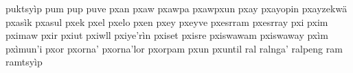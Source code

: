 puktsyìp\hspace{2mm}
pum\hspace{2mm}
pup\hspace{2mm}
puve\hspace{2mm}
pxan\hspace{2mm}
pxaw\hspace{2mm}
pxawpa\hspace{2mm}
pxawpxun\hspace{2mm}
pxay\hspace{2mm}
pxayopin\hspace{2mm}
pxayzekwä\hspace{2mm}
pxasìk\hspace{2mm}
pxasul\hspace{2mm}
pxek\hspace{2mm}
pxel\hspace{2mm}
pxelo\hspace{2mm}
pxen\hspace{2mm}
pxey\hspace{2mm}
pxeyve\hspace{2mm}
pxesrram\hspace{2mm}
pxesrray\hspace{2mm}
pxi\hspace{2mm}
pxim\hspace{2mm}
pximaw\hspace{2mm}
pxir\hspace{2mm}
pxiut\hspace{2mm}
pxiwll\hspace{2mm}
pxiye'rìn\hspace{2mm}
pxiset\hspace{2mm}
pxisre\hspace{2mm}
pxiswawam\hspace{2mm}
pxiswaway\hspace{2mm}
pxìm\hspace{2mm}
pxìmun'i\hspace{2mm}
pxor\hspace{2mm}
pxorna'\hspace{2mm}
pxorna'lor\hspace{2mm}
pxorpam\hspace{2mm}
pxun\hspace{2mm}
pxuntil\hspace{2mm}
ral\hspace{2mm}
ralnga'\hspace{2mm}
ralpeng\hspace{2mm}
ram\hspace{2mm}
ramtsyìp\hspace{2mm}
